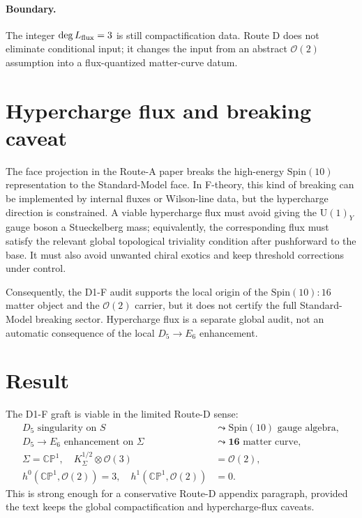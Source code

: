 \documentclass[11pt]{article}
\newcommand{\Spin}{\mathrm{Spin}}
\newcommand{\U}{\mathrm{U}}
\newcommand{\CP}{\mathbb{CP}}
\newcommand{\cO}{\mathcal{O}}
\begin{document}
\paragraph{Boundary.}
The integer \(\deg L_{\rm flux}=3\) is still compactification data.  Route D
does not eliminate conditional input; it changes the input from an abstract
\(\cO(2)\) assumption into a flux-quantized matter-curve datum.

\section{Hypercharge flux and breaking caveat}

The face projection in the Route-A paper breaks the high-energy
\(\Spin(10)\) representation to the Standard-Model face.  In F-theory, this
kind of breaking can be implemented by internal fluxes or Wilson-line data,
but the hypercharge direction is constrained.  A viable hypercharge flux must
avoid giving the \(\U(1)_Y\) gauge boson a Stueckelberg mass; equivalently,
the corresponding flux must satisfy the relevant global topological
triviality condition after pushforward to the base.  It must also avoid
unwanted chiral exotics and keep threshold corrections under control.

Consequently, the D1-F audit supports the local origin of the
\(\Spin(10):16\) matter object and the \(\cO(2)\) carrier, but it does not
certify the full Standard-Model breaking sector.  Hypercharge flux is a
separate global audit, not an automatic consequence of the local
\(D_5\to E_6\) enhancement.

\section{Result}

The D1-F graft is viable in the limited Route-D sense:
\begin{align}
  D_5\text{ singularity on }S
  &\leadsto
  \Spin(10)\text{ gauge algebra},\\
  D_5\to E_6\text{ enhancement on }\Sigma
  &\leadsto
  \mathbf{16}\text{ matter curve},\\
  \Sigma=\CP^1,\quad
  K_\Sigma^{1/2}\otimes \cO(3)
  &=
  \cO(2),\\
  h^0(\CP^1,\cO(2))=3,\quad h^1(\CP^1,\cO(2))&=0.
\end{align}
This is strong enough for a conservative Route-D appendix paragraph, provided
the text keeps the global compactification and hypercharge-flux caveats.
\end{document}
